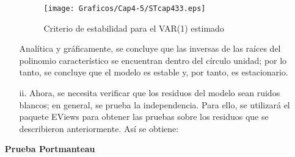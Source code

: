 \begin{enumerate}
\begin{enumerate}
\begin{figure}[H]
\centering
\texttt{[image: Graficos/Cap4-5/STcap433.eps]}
\caption{Criterio de estabilidad para el VAR(1) estimado}
\label{fig33}
\end{figure}

Anal\'{i}tica y gr\'{a}ficamente, se concluye que las inversas de las ra\'{i}ces del polinomio caracter\'{i}stico se encuentran dentro del c\'{i}rculo unidad; por lo tanto, se concluye que el modelo es estable y, por tanto, es estacionario.

      \item[ii.] Ahora, se necesita verificar que los residuos del modelo sean ruidos blancos; en general, se prueba la independencia. Para ello, se utilizar\'{a} el paquete EViews para obtener las pruebas sobre los residuos que se describieron anteriormente. As\'{i} se obtiene:

\end{enumerate}



\textbf{Prueba Portmanteau}


\end{enumerate}
